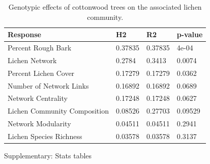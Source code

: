 \documentclass[9pt,twocolumn,twoside,lineno]{pnas-new}
\begin{document}
{%
\begin{table}[ht]
\centering
\begin{tabular}{llll}
  \hline
Response & H2 & R2 & p-value \\ 
  \hline
  Percent Rough Bark           & 0.37835 & 0.37835 & 4e-04 \\ 
  Lichen Network               & 0.2784  & 0.3413  & 0.0074 \\ 
  Percent Lichen Cover         & 0.17279 & 0.17279 & 0.0362 \\ 
  Number of Network Links      & 0.16892 & 0.16892 & 0.0689 \\ 
  Network Centrality           & 0.17248 & 0.17248 & 0.0627 \\ 
  Lichen Community Composition & 0.08526 & 0.27703 & 0.09529 \\ 
  Network Modularity           & 0.04511 & 0.04511 & 0.2941 \\ 
  Lichen Species Richness      & 0.03578 & 0.03578 & 0.3137 \\ 
   \hline
\end{tabular}
\caption{Genotypic effects of cottonwood trees on the associated lichen community.} 
\label{tab:h2_table}
\end{table}

Supplementary: Stats tables



}
\end{document}
